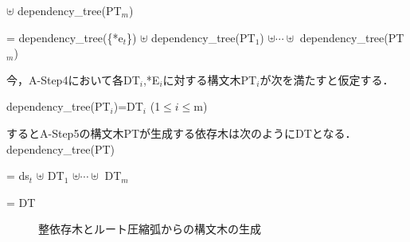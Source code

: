 \begin{theorem}[依存森の健全性]
{\hspace{11mm}${\uplus}$ dependency\_tree(PT$_m$)

\hspace{7mm}= dependency\_tree(\{*e$_t$\}) ${\uplus}$ dependency\_tree(PT$_1$) ${\uplus} {\cdots} {\uplus}$ dependency\_tree(PT$_m$) 

\mygapskip

{\mynoindent}今，A-Step4において各DT$_i$,*E$_i$に対する構文木PT$_i$が次を満たすと仮定する．

\mygapskip
\hspace{5mm}dependency\_tree(PT$_i$)=DT$_i$  (1${\leq}i{\leq}$m)
\mygapskip

{\mynoindent}するとA-Step5の構文木PTが生成する依存木は次のようにDTとなる．
\mygapskip
\hspace{5mm}dependency\_tree(PT)

\hspace{7mm}= ds$_t$ ${\uplus}$ DT$_1$ ${\uplus}{\cdots}{\uplus}$ DT$_m$

\hspace{7mm}= DT
\mygapskip


}
\end{theorem}

\begin{figure}[h]
 \begin{center}
 \end{center}
\myfiglabelskip
\myfiglabelskippre
\caption{整依存木とルート圧縮弧からの構文木の生成}
\myfiglabelskippost
\label{fig:DttoParseTreeExplain}
\end{figure}




